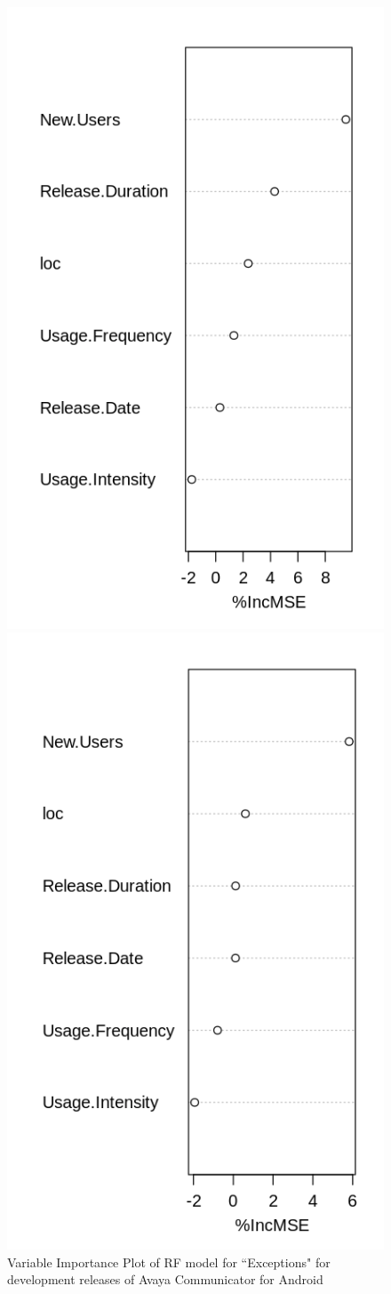 \documentclass[smallcondensed]{svjour3}     %
\begin{document}
\begin{figure}[!t]
\centering
\begin{minipage}{.45\textwidth}
\includegraphics[width=0.7\linewidth]{loc_d_rf}%
\caption{Variable Importance Plot of RF model for ``Exceptions" for development releases of Avaya Communicator for Android}
\label{fig:lrfd}
\end{minipage}
\hfill
\begin{minipage}{.45\textwidth}
\includegraphics[width=0.7\linewidth]{loc_i_rf}%

\end{minipage}
\end{figure}
\end{document}

